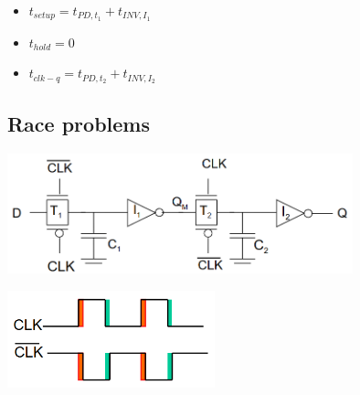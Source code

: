 \documentclass{article}
\begin{document}
\begin{itemize}
    \item $t_{setup} = t_{PD,t_{1}} + t_{INV,I_{1}}$
    \item $t_{hold} = 0$
    \item $t_{clk-q} = t_{PD,t_{2}} + t_{INV,I_{2}}$
\end{itemize}

\vspace{1cm}
\subsection{Race problems}
\begin{minipage}[t]{0.5\textwidth}
    \centering
    \includegraphics[width=10cm, scale=1]{registerRace.PNG}
    \captionsetup{justification=centering}
\end{minipage}%
\begin{minipage}[t]{0.5\textwidth}
    \centering
    \includegraphics[width=6cm, scale=1]{raceClock.PNG}
    \captionsetup{justification=centering}
\end{minipage}%
\end{document}
